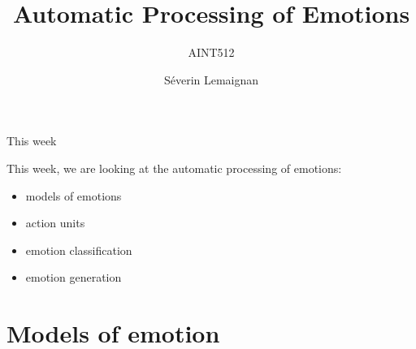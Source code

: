 \documentclass[compress]{beamer}
\title{Automatic Processing of Emotions}
\subtitle{AINT512}
\date{}
\author{Séverin Lemaignan}
\institute{Centre for Neural Systems and Robotics\\{\bf Plymouth University}}
\makeatletter
\let\beamer@writeslidentry@miniframeson=\beamer@writeslidentry
\def\beamer@writeslidentry@miniframesoff{%
  \expandafter\beamer@ifempty\expandafter{\beamer@framestartpage}{}%
  {%
    \clearpage\beamer@notesactions%
  }
}
\newcommand*{\miniframeson}{\let\beamer@writeslidentry=\beamer@writeslidentry@miniframeson}
\newcommand*{\miniframesoff}{\let\beamer@writeslidentry=\beamer@writeslidentry@miniframesoff}
\makeatother
\begin{document}
\miniframesoff


\maketitle


\begin{frame}{This week}

This week, we are looking at the automatic processing of emotions:

    \begin{itemize}
        \item models of emotions
        \item action units
        \item emotion classification
        \item emotion generation
    \end{itemize}

\end{frame}

\miniframeson

\section{Models of emotion}
\end{document}
